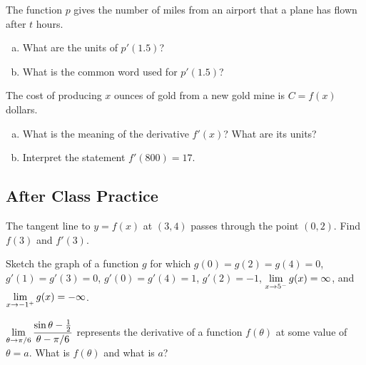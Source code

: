\documentclass[notes]{subfiles}
\begin{document}
		\begin{ex}
			The function \(p\) gives the number of miles from an airport that a plane has flown after \(t\) hours.
			\begin{enumerate}[(a)]
				\item What are the units of \(p'(1.5)\)?
					\newpage
					
				\item What is the common word used for \(p'(1.5)\)?
			\end{enumerate}
		\end{ex}

		\begin{ex}
			The cost of producing \(x\) ounces of gold from a new gold mine is \(C=f(x)\) dollars.
			\begin{enumerate}[(a)]
				\item What is the meaning of the derivative \(f'(x)\)?  What are its units?
					\vs{1}
				\item Interpret the statement \(f'(800) = 17\).
					\vs{1}
			\end{enumerate}
		\end{ex}
			\newpage
			
	\subsection*{After Class Practice}
		\begin{ex}
			The tangent line to \(y = f(x)\) at \((3,4)\) passes through the point \((0,2)\).  Find \(f(3)\) and \(f'(3)\).
		\end{ex}
			
		\begin{ex}
			Sketch the graph of a function \(g\) for which \(g(0) = g(2) = g(4) = 0\), \(g'(1) = g'(3) = 0\), \(g'(0) = g'(4) = 1\), \(g'(2) = -1\), \(\displaystyle \lim_{x\to 5^-} g(x) = \infty\), and \(\displaystyle \lim_{x\to -1^+} g(x) = -\infty\).
		\end{ex}
			\vs{2}
			
		\begin{ex}
			\(\displaystyle \lim_{\theta\to \pi/6} \dfrac{\sin\theta - \frac{1}{2}}{\theta - \pi/6}\) represents the derivative of a function \(f(\theta)\) at some value of \(\theta = a \).  What is \(f(\theta)\) and what is \(a\)?
		\end{ex}	
\clearpage
\end{document}
